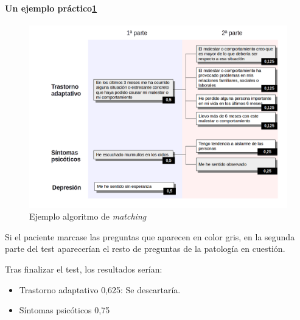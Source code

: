 \paragraph{Un ejemplo práctico\ref{ej_alg_match}}


\begin{figure}[htbp] 
    \centering
    \includegraphics[width=1\textwidth]{figuras/alg_matching.png}
    \caption{Ejemplo algoritmo de \textit{matching}}
    \label{ej_alg_match}
\end{figure}	

Si el paciente marcase las preguntas que aparecen en color gris, en la segunda parte del test aparecerían el resto de preguntas de la patología en cuestión.


Tras finalizar el test, los resultados serían:

\begin{itemize}
\item Trastorno adaptativo 0,625: Se descartaría.
\item Síntomas psicóticos 0,75
\end{itemize}


